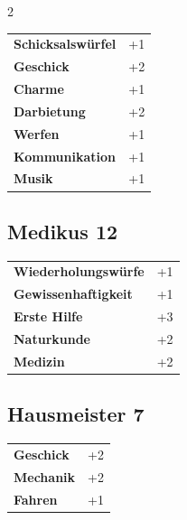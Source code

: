 \begin{multicols}{2}
\begin{tcolorbox}
\begin{tabular}{@{}ll@{}}
    \textbf{Schicksalswürfel} & +1\\
    \textbf{Geschick} & +2\\
    \textbf{Charme} & +1\\
    \textbf{Darbietung} & +2\\
    \textbf{Werfen} & +1\\
    \textbf{Kommunikation} & +1\\
    \textbf{Musik} & +1\\
\end{tabular}


\end{tcolorbox}

\begin{tcolorbox}
    \subsection*{Medikus \hfill \small{12 }}
    \tcblower




\begin{tabular}{@{}ll@{}}
    \textbf{Wiederholungswürfe} & +1\\
    \textbf{Gewissenhaftigkeit} & +1\\
    \textbf{Erste Hilfe} & +3\\
    \textbf{Naturkunde} & +2\\
    \textbf{Medizin} & +2\\
\end{tabular}


\end{tcolorbox}

\begin{tcolorbox}
    \subsection*{Hausmeister \hfill \small{7 }}
    \tcblower




\begin{tabular}{@{}ll@{}}
    \textbf{Geschick} & +2\\
    \textbf{Mechanik} & +2\\
    \textbf{Fahren} & +1\\
\end{tabular}


\end{tcolorbox}
\end{multicols}
